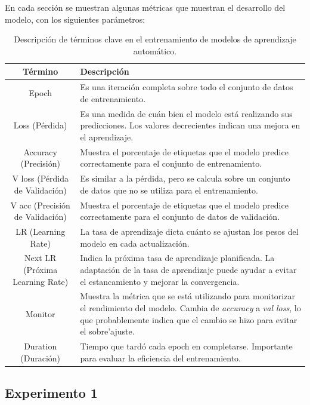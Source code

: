 En cada sección se muestran algunas métricas que muestran el desarrollo del modelo, con los siguientes parámetros:

\begin{table}[ht]
   \centering
   \small
   \begin{tabular}{|c|p{10cm}|}
   \hline
   \textbf{Término} & \textbf{Descripción} \\
   \hline
   Epoch & Es una iteración completa sobre todo el conjunto de datos de entrenamiento. \\
   \hline
   Loss (Pérdida) & Es una medida de cuán bien el modelo está realizando sus predicciones. Los valores decrecientes indican una mejora en el aprendizaje. \\
   \hline
   Accuracy (Precisión) & Muestra el porcentaje de etiquetas que el modelo predice correctamente para el conjunto de entrenamiento. \\
   \hline
   V loss (Pérdida de Validación) & Es similar a la pérdida, pero se calcula sobre un conjunto de datos que no se utiliza para el entrenamiento. \\
   \hline
   V acc (Precisión de Validación) & Muestra el porcentaje de etiquetas que el modelo predice correctamente para el conjunto de datos de validación. \\
   \hline
   LR (Learning Rate) & La tasa de aprendizaje dicta cuánto se ajustan los pesos del modelo en cada actualización. \\
   \hline
   Next LR (Próxima Learning Rate) & Indica la próxima tasa de aprendizaje planificada. La adaptación de la tasa de aprendizaje puede ayudar a evitar el estancamiento y mejorar la convergencia. \\
   \hline
   Monitor & Muestra la métrica que se está utilizando para monitorizar el rendimiento del modelo. Cambia de \textit{accuracy} a \textit{val loss}, lo que probablemente indica que el cambio se hizo para evitar el sobre'ajuste. \\
   \hline
   Duration (Duración) & Tiempo que tardó cada epoch en completarse. Importante para evaluar la eficiencia del entrenamiento. \\
   \hline
   \end{tabular}
   \caption{Descripción de términos clave en el entrenamiento de modelos de aprendizaje automático.}
   \label{table:terminology}
   \end{table}
   

\subsection{Experimento 1}

